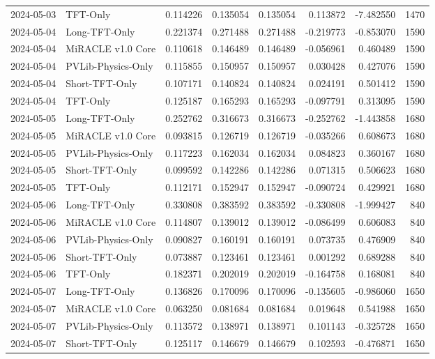 \begin{tabular}{llrrrrrr}
2024-05-03 & TFT-Only & 0.114226 & 0.135054 & 0.135054 & 0.113872 & -7.482550 & 1470 \\
2024-05-04 & Long-TFT-Only & 0.221374 & 0.271488 & 0.271488 & -0.219773 & -0.853070 & 1590 \\
2024-05-04 & MiRACLE v1.0 Core & 0.110618 & 0.146489 & 0.146489 & -0.056961 & 0.460489 & 1590 \\
2024-05-04 & PVLib-Physics-Only & 0.115855 & 0.150957 & 0.150957 & 0.030428 & 0.427076 & 1590 \\
2024-05-04 & Short-TFT-Only & 0.107171 & 0.140824 & 0.140824 & 0.024191 & 0.501412 & 1590 \\
2024-05-04 & TFT-Only & 0.125187 & 0.165293 & 0.165293 & -0.097791 & 0.313095 & 1590 \\
2024-05-05 & Long-TFT-Only & 0.252762 & 0.316673 & 0.316673 & -0.252762 & -1.443858 & 1680 \\
2024-05-05 & MiRACLE v1.0 Core & 0.093815 & 0.126719 & 0.126719 & -0.035266 & 0.608673 & 1680 \\
2024-05-05 & PVLib-Physics-Only & 0.117223 & 0.162034 & 0.162034 & 0.084823 & 0.360167 & 1680 \\
2024-05-05 & Short-TFT-Only & 0.099592 & 0.142286 & 0.142286 & 0.071315 & 0.506623 & 1680 \\
2024-05-05 & TFT-Only & 0.112171 & 0.152947 & 0.152947 & -0.090724 & 0.429921 & 1680 \\
2024-05-06 & Long-TFT-Only & 0.330808 & 0.383592 & 0.383592 & -0.330808 & -1.999427 & 840 \\
2024-05-06 & MiRACLE v1.0 Core & 0.114807 & 0.139012 & 0.139012 & -0.086499 & 0.606083 & 840 \\
2024-05-06 & PVLib-Physics-Only & 0.090827 & 0.160191 & 0.160191 & 0.073735 & 0.476909 & 840 \\
2024-05-06 & Short-TFT-Only & 0.073887 & 0.123461 & 0.123461 & 0.001292 & 0.689288 & 840 \\
2024-05-06 & TFT-Only & 0.182371 & 0.202019 & 0.202019 & -0.164758 & 0.168081 & 840 \\
2024-05-07 & Long-TFT-Only & 0.136826 & 0.170096 & 0.170096 & -0.135605 & -0.986060 & 1650 \\
2024-05-07 & MiRACLE v1.0 Core & 0.063250 & 0.081684 & 0.081684 & 0.019648 & 0.541988 & 1650 \\
2024-05-07 & PVLib-Physics-Only & 0.113572 & 0.138971 & 0.138971 & 0.101143 & -0.325728 & 1650 \\
2024-05-07 & Short-TFT-Only & 0.125117 & 0.146679 & 0.146679 & 0.102593 & -0.476871 & 1650 \\

\end{tabular}
